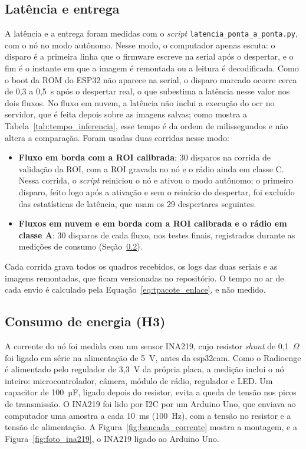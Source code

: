 \subsection{Latência e entrega}
\label{subsec:exp_latencia}

A latência e a entrega foram medidas com o \textit{script} \texttt{latencia\_ponta\_a\_ponta.py},
com o nó no modo autônomo. Nesse modo, o computador apenas escuta: o disparo é a primeira
linha que o firmware escreve na serial após o despertar, e o fim é o instante em que a
imagem é remontada ou a leitura é decodificada. Como o boot da ROM do ESP32 não aparece na
serial, o disparo marcado ocorre cerca de 0,3 a 0,5~s após o despertar real, o que
subestima a latência nesse valor nos dois fluxos. No fluxo em nuvem, a latência não inclui a
execução do \gls{ocr} no servidor, que é feita depois sobre as imagens salvas; como mostra a
Tabela~\ref{tab:tempo_inferencia}, esse tempo é da ordem de milissegundos e não altera a
comparação. Foram usadas duas corridas nesse modo:

\begin{itemize}
    \item \textbf{Fluxo em borda com a ROI calibrada}: 30 disparos
    na corrida de validação da ROI, com a ROI gravada no nó e o rádio ainda em classe C. Nessa corrida, o \textit{script} reiniciou o nó e
    ativou o modo autônomo; o primeiro disparo, feito logo após a ativação e sem o reinício
    do despertar, foi excluído das estatísticas de latência, que usam os 29 despertares
    seguintes.
    \item \textbf{Fluxos em nuvem e em borda com a ROI calibrada e o rádio em classe A}: 30
    disparos de cada fluxo, nos testes finais, registrados durante as medições de consumo
    (Seção~\ref{subsec:exp_energia}).
\end{itemize}

Cada corrida grava todos os quadros
recebidos, os logs das duas seriais e as imagens remontadas, que ficam versionadas no
repositório. O tempo no ar de cada envio é calculado pela Equação~\eqref{eq:tpacote_enlace},
e não medido.

\subsection{Consumo de energia (H3)}
\label{subsec:exp_energia}

A corrente do nó foi medida com um sensor INA219, cujo resistor \textit{shunt} de
0,1~$\Omega$ foi ligado em série na alimentação de 5~V, antes da \gls{esp32cam}. Como o
Radioenge é alimentado pelo regulador de 3,3~V da própria placa, a medição inclui o nó
inteiro: microcontrolador, câmera, módulo de rádio, regulador e LED. Um capacitor de
100~µF, ligado depois do resistor, evita a queda de tensão nos picos de transmissão. O
INA219 foi lido por I2C por um Arduino Uno, que enviava ao computador uma amostra a cada
10~ms (100~Hz), com a tensão no resistor e a tensão de alimentação. A
Figura~\ref{fig:bancada_corrente} mostra a montagem, e a Figura~\ref{fig:foto_ina219}, o
INA219 ligado ao Arduino Uno.

